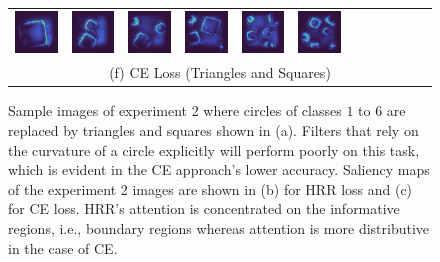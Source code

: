 \documentclass[letterpaper]{article} %
\begin{document}
\begin{figure}[!htbp]
\begin{tabular}{cccccccccccc}
\multicolumn{1}{c}{\includegraphics[width=0.125\columnwidth]{saliency/ce/circle/square_1.png}} \hspace{-12pt} &  \multicolumn{1}{c}{\includegraphics[width=0.125\columnwidth]{saliency/ce/circle/square_2.png}} \hspace{-12pt} & \multicolumn{1}{c}{\includegraphics[width=0.125\columnwidth]{saliency/ce/circle/square_3.png}} \hspace{-12pt} & \multicolumn{1}{c}{\includegraphics[width=0.125\columnwidth]{saliency/ce/circle/square_4.png}} \hspace{-12pt} & \multicolumn{1}{c}{\includegraphics[width=0.125\columnwidth]{saliency/ce/circle/square_5.png}} \hspace{-12pt} & \multicolumn{1}{c}{\includegraphics[width=0.125\columnwidth]{saliency/ce/circle/square_6.png}} \\
\multicolumn{12}{c}{(f) CE Loss (Triangles and Squares)}
\end{tabular}
\caption{Sample images of experiment 2 where circles of classes $1$ to $6$ are replaced by triangles and squares shown in (a). Filters that rely on the curvature of a circle explicitly will perform poorly on this task, which is evident in the CE approach's lower accuracy. Saliency maps of the experiment 2 images are shown in (b) for HRR loss and (c) for CE loss. HRR’s attention is concentrated on the informative regions, i.e., boundary regions whereas attention is more distributive in the case of CE.}
\label{fig:exp_2_saliency}
\end{figure}
\end{document}
